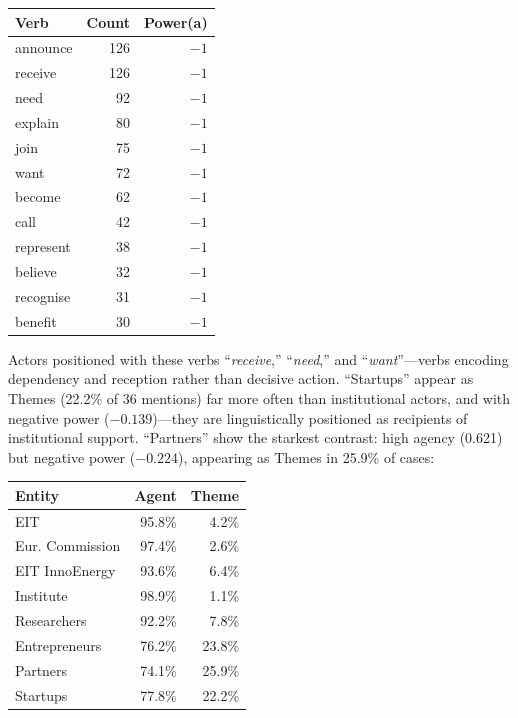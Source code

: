 \documentclass[../main.tex]{subfiles}
\begin{document}
\begin{center}
\small
\begin{tabular}{lrr}
\toprule
\textbf{Verb} & \textbf{Count} & \textbf{Power(a)} \\
\midrule
announce & 126 & $-1$ \\
receive & 126 & $-1$ \\
need & 92 & $-1$ \\
explain & 80 & $-1$ \\
join & 75 & $-1$ \\
want & 72 & $-1$ \\
become & 62 & $-1$ \\
call & 42 & $-1$ \\
represent & 38 & $-1$ \\
believe & 32 & $-1$ \\
recognise & 31 & $-1$ \\
benefit & 30 & $-1$ \\
\bottomrule
\end{tabular}
\end{center}

Actors positioned with these verbs ``\textit{receive},'' ``\textit{need},'' and ``\textit{want}''---verbs encoding dependency and reception rather than decisive action. ``Startups'' appear as Themes (22.2\% of 36 mentions) far more often than institutional actors, and with negative power ($-0.139$)---they are linguistically positioned as recipients of institutional support. ``Partners'' show the starkest contrast: high agency (0.621) but negative power ($-0.224$), appearing as Themes in 25.9\% of cases:

\begin{margintable}
\centering
\small
\begin{tabular}{lrr}
\toprule
\textbf{Entity} & \textbf{Agent} & \textbf{Theme} \\
\midrule
EIT & 95.8\% & 4.2\% \\
Eur. Commission & 97.4\% & 2.6\% \\
EIT InnoEnergy & 93.6\% & 6.4\% \\
Institute & 98.9\% & 1.1\% \\
Researchers & 92.2\% & 7.8\% \\
Entrepreneurs & 76.2\% & 23.8\% \\
Partners & 74.1\% & 25.9\% \\
Startups & 77.8\% & 22.2\% \\
\bottomrule
\end{tabular}
\caption{Agent vs. Theme position by entity}
\end{margintable}
\end{document}
